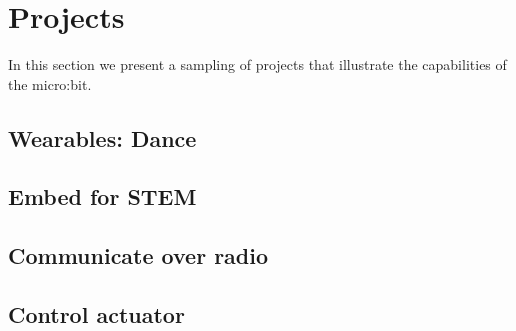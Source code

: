 \section{Projects}
\label{sec:}

In this section we present a sampling of projects that 
illustrate the capabilities of the micro:bit. 

\subsection{Wearables: Dance}





\subsection{Embed for STEM}

%


\subsection{Communicate over radio}





\subsection{Control actuator}


